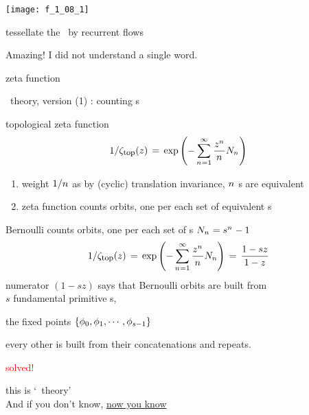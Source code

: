 \begin{frame}{}
\begin{center}
\texttt{[image: f\_1\_08\_1]}
\end{center}
 tessellate the \statesp\ by {\Large recurrent flows}
\end{frame} %

\begin{frame}{}
\begin{bartlett}
     Amazing! I did not understand a single word.
\end{bartlett}

\vfill
\begin{center}
{\huge zeta function}
\end{center}
\vfill
\end{frame} %


\begin{frame}{\po\ theory, version (1) : counting {\lattstate}s}

\begin{block}{topological zeta function}
\[
1/\zeta_{\mbox{\footnotesize top}} (z)
 \,=\,  \exp \left(-\sum_{{n_{}}=1}^\infty
\frac{z^{n_{}}}{{n_{}}} N_{n_{}}
         \right)
\] %
\end{block}
        \begin{enumerate}
              \item
weight ${1}/{{n_{}}}$
as by (cyclic) translation invariance, ${n_{}}$ {\lattstate}s are
equivalent
              \item
zeta function counts {\color{blue} orbits}, one per each set of equivalent
{\lattstate}s
            \end{enumerate}
\end{frame} %

\begin{frame}{Bernoulli \tzeta}
counts {\color{blue} orbits},
one per each set of {\lattstate}s $N_{n_{}}=s^{{n_{}}} - 1$
\[
1/\zeta_{\mbox{\footnotesize top}} (z)
 \,=\,  \exp \left(-\sum_{{n_{}}=1}^\infty
\frac{z^{n_{}}}{{n_{}}} N_n
         \right)
\,=\,
\frac{1 -  {s}z}{1 - z}
\] %
numerator $(1 - {s}z)$ says that Bernoulli orbits are built from \\
$s$
fundamental {\color{blue}primitive} {\lattstate}s,

\hfill
the fixed points
$\{\phi_0,\phi_1,\cdots,\phi_{s-1}\}$
\medskip

every other {\lattstate} is
built from their concatenations and repeats.

\vfill
\hfill {\Huge \textcolor{red}{solved!}}
\vfill

{\color{blue}this is `\po\ theory'}
\\
 And if you don't know,
{\underline{now you know}}
\end{frame} %

